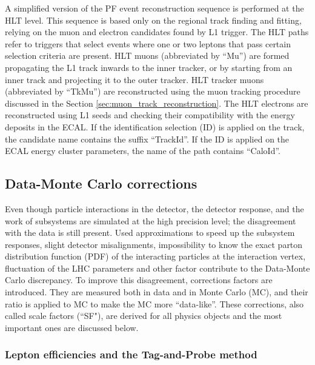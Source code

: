 \begin{small}
A simplified version of the PF event reconstruction sequence is performed at the HLT level. This sequence is based only on the regional track finding and fitting, relying on the muon and electron candidates found by L1 trigger. The HLT paths refer to triggers that select events where one or two leptons that pass certain selection criteria are present. HLT muons (abbreviated by ``Mu'') are formed propagating the L1 track inwards to the inner tracker, or by starting from an inner track and projecting it to the outer tracker. HLT tracker muons (abbreviated by ``TkMu'') are reconstructed using the muon tracking procedure discussed in the Section \ref{sec:muon_track_reconstruction}. The HLT electrons are reconstructed using L1 seeds and checking their compatibility with the energy deposits in the ECAL. If the identification selection (ID) is applied on the track, the candidate name contains the suffix ``TrackId''. If the ID is applied on the ECAL energy cluster parameters, the name of the path contains ``CaloId''.

\subsection{Data-Monte Carlo corrections}\label{sec:data_mc}

Even though particle interactions in the detector, the detector response, and the work of subsystems are simulated at the high precision level; the disagreement with the data is still present. Used approximations to speed up the subsystem responses, slight detector misalignments, impossibility to know the exact parton distribution function (PDF) of the interacting particles at the interaction vertex, fluctuation of the LHC parameters and other factor contribute to the Data-Monte Carlo discrepancy. To improve this disagreement, corrections factors are introduced. They are measured both in data and in Monte Carlo (MC), and their ratio is applied to MC to make the MC more ``data-like''. These corrections, also called scale factors (``SF"), are derived for all physics objects and the most important ones are discussed below.

\subsubsection{Lepton efficiencies and the Tag-and-Probe method}\label{sec:TnP}


\end{small}
